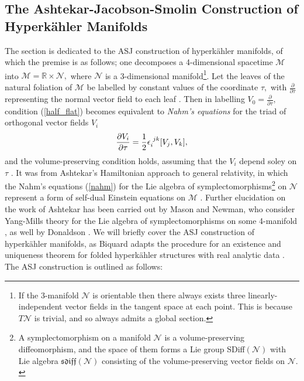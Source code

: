 \documentclass[a4paper,12pt, onecolumn, notitlepage]{article}
\theoremstyle{definition}
\theoremstyle{remark}
\newcommand{\e}{\epsilon}
\newcommand{\ddt}[1]{\frac{\partial #1}{\partial \tau}}
\newcommand{\dd}[2]{\frac{\partial #1}{\partial #2}}
\newcommand{\HK}{hyperk\"ahler }
\newcommand{\R}{\mathbb{R}}
\begin{document}
\subsection{The Ashtekar-Jacobson-Smolin Construction of Hyperk\"ahler Manifolds}
The section is dedicated to the ASJ construction of \HK manifolds, of which the premise is as follows; one decomposes a 4-dimensional spacetime $\mathcal{M}$ into $\mathcal{M}=\R\times \mathcal{N},$ where $\mathcal{N}$ is a 3-dimensional manifold\footnote{If the 3-manifold $\mathcal{N}$ is orientable then there always exists three linearly-independent vector fields in the tangent space at each point. This is because $T\mathcal{N}$ is trivial, and so always admits a global section.}. Let the leaves of the natural foliation of $\mathcal{M}$ be labelled by constant values of the coordinate $\tau,$ with $\ddt{}$ representing the normal vector field to each leaf \cite{donaldson}. Then in labelling $V_{0}=\ddt{},$ condition (\ref{half_flat}) becomes equivalent to \emph{Nahm's equations} for the triad of orthogonal vector fields $V_{i}$
\begin{equation}
\label{nahm}
\dd{V_{i}}{\tau} = \frac{1}{2}\e\indices{_i^j^k}[V_{j},V_{k}],
\end{equation}
and the volume-preserving condition holds, assuming that the $V_{i}$ depend soley on $\tau$ \cite{donaldson}. It was from Ashtekar's Hamiltonian approach to general relativity, in which the Nahm's equations (\ref{nahm}) for the Lie algebra of symplectomorphisms\footnote{A symplectomorphism on a manifold $\mathcal{N}$ is a  volume-preserving diffeomorphism, and the space of them forms a Lie group  SDiff$(\mathcal{N})$ with Lie algebra $\mathfrak{sdiff}(\mathcal{N})$ consisting of the volume-preserving vector fields on $\mathcal{N}.$} on $\mathcal{N}$ represent a form of self-dual Einstein equations on $\mathcal{M}$ \cite{ashtekar_1987}. Further elucidation on the work of Ashtekar has been carried out by Mason and Newman, who consider Yang-Mills theory for the Lie algebra of symplectomorphisms on some 4-manifold \cite{mason_1989}, as well by Donaldson \cite{donaldson}. We will briefly cover the ASJ construction of \HK manifolds, as Biquard adapts the procedure for an existence and uniqueness theorem for folded \HK structures with real analytic data \cite{biquard_2015}.\\
The ASJ construction is outlined as follows:\\
\end{document}
